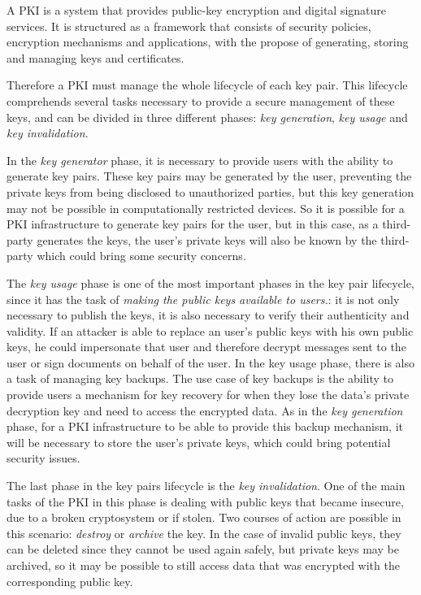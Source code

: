 A \acl{PKI}\cite{choudhury2002public}\cite{Entrust2000} is a system that provides public-key encryption and digital signature services. It is structured as a framework that consists of security policies, encryption mechanisms and applications, with the propose of generating, storing and managing keys and certificates.

Therefore a \ac{PKI} must manage the whole lifecycle of each key pair\cite{Buchmann2013}. This lifecycle comprehends several tasks necessary to provide a secure management of these keys, and can be divided in three different phases: \textit{key generation}, \textit{key usage} and \textit{key invalidation}.

In the \textit{key generator} phase, it is necessary to provide users with the ability to generate key pairs. These key pairs may be generated by the user, preventing the private keys from being disclosed to unauthorized parties, but this key generation may not be possible in computationally restricted devices. So it is possible for a \ac{PKI} infrastructure to generate key pairs for the user, but in this case, as a third-party generates the keys, the user's private keys will also be known by the third-party which could bring some security concerns.

The \textit{key usage} phase is one of the most important phases in the key pair lifecycle, since it has the task of \textit{making the public keys available to users.}: it is not only necessary to publish the keys, it is also necessary to verify their authenticity and validity. If an attacker is able to replace an user's public keys with his own public keys, he could impersonate that user and therefore decrypt messages sent to the user or sign documents on behalf of the user. In the key usage phase, there is also a task of managing key backups. The use case of key backups is the ability to provide users a mechanism for key recovery for when they lose the data's private decryption key and need to access the encrypted data. As in the \textit{key generation} phase, for a \ac{PKI} infrastructure to be able to provide this backup mechanism, it will be necessary to store the user's private keys, which could bring potential security issues.

The last phase in the key pairs lifecycle is the \textit{key invalidation}. One of the main tasks of the \ac{PKI} in this phase is dealing with public keys that became insecure, due to a broken cryptosystem or if stolen. Two courses of action are possible in this scenario: \textit{destroy} or \textit{archive} the key. In the case of invalid public keys, they can be deleted since they cannot be used again safely, but private keys may be archived, so it may be possible to still access data that was encrypted with the corresponding public key.

